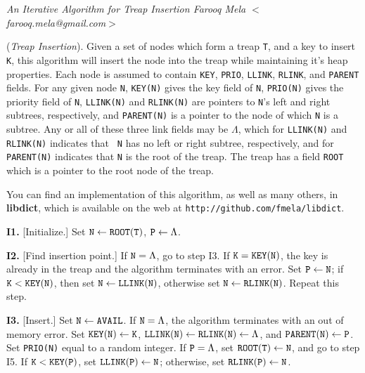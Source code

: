 \nopagenumbers
\parskip=2pt
\parindent=0pt

{\sl An Iterative Algorithm for Treap Insertion
	\hfill \rm Farooq Mela $<$farooq.mela@gmail.com$>$}

\medskip

 ({\it Treap Insertion}).
Given a set of nodes which form a treap {\tt T}, and a key to insert
{\tt K}, this algorithm will insert the node into the treap while maintaining
it's heap properties. Each node is assumed to contain {\tt KEY}, {\tt PRIO},
{\tt LLINK}, {\tt RLINK}, and {\tt PARENT} fields. For any given node {\tt N},
{\tt KEY(N)} gives the key field of {\tt N}, {\tt PRIO(N)} gives the priority
field of {\tt N}, {\tt LLINK(N)} and {\tt RLINK(N)} are pointers to {\tt N}'s
left and right subtrees, respectively, and {\tt PARENT(N)} is a pointer to the
node of which {\tt N} is a subtree. Any or all of these three link fields may
be $\Lambda$, which for {\tt LLINK(N)} and {\tt RLINK(N)} indicates that {\tt
N} has no left or right subtree, respectively, and for {\tt PARENT(N)}
indicates that {\tt N} is the root of the treap. The treap has a field
{\tt ROOT} which is a pointer to the root node of the treap.

\medskip
You can find an implementation of this algorithm, as well as many others, in
{\bf libdict}, which is available on the web at
{\tt http://github.com/fmela/libdict}.
\medskip

\parindent=36pt

\item{\bf I1.} [Initialize.]
Set ${\tt N} \gets {\tt ROOT(T)}$, ${\tt P} \gets \Lambda$.

\item{\bf I2.} [Find insertion point.]
If ${\tt N} = \Lambda$, go to step I3.
If ${\tt K} = {\tt KEY(N)}$,
the key is already in the treap and the algorithm terminates with an error.
Set ${\tt P} \gets {\tt N}$;
if ${\tt K} < {\tt KEY(N)}$,
then set ${\tt N} \gets {\tt LLINK(N)}$,
otherwise set ${\tt N} \gets {\tt RLINK(N)}$. Repeat this step.

\item{\bf I3.} [Insert.]
Set ${\tt N} \gets {\tt AVAIL}$.
If ${\tt N} = \Lambda$, the algorithm terminates with an out of memory error.
Set ${\tt KEY(N)} \gets {\tt K}$,
${\tt LLINK(N)} \gets {\tt RLINK(N)} \gets \Lambda$, and
${\tt PARENT(N)} \gets {\tt P}$.
Set {\tt PRIO(N)} equal to a random integer.
If ${\tt P} = \Lambda$, set ${\tt ROOT(T)} \gets {\tt N}$, and go to step I5.
If ${\tt K} < {\tt KEY(P)}$,
set ${\tt LLINK(P)} \gets {\tt N}$; otherwise,
set ${\tt RLINK(P)} \gets {\tt N}$.

